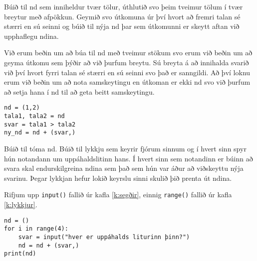 \begin{exercise}\label{nd3}
Búið til nd sem inniheldur tvær tölur, úthlutið svo þeim tveimur tölum í tvær breytur með afpökkun.
Geymið svo útkomuna úr því hvort að fremri talan sé stærri en sú seinni og búið til nýja nd þar sem útkomunni er skeytt aftan við upphaflegu ndina.
\end{exercise}
\begin{Answer}[ref={nd3}]
Við erum beðin um að búa til nd með tveimur stökum svo erum við beðin um að geyma útkomu sem þýðir að við þurfum breytu.
Sú breyta á að innihalda svarið við því hvort fyrri talan sé stærri en sú seinni svo það er sanngildi.
Að því loknu erum við beðin um að nota samskeytingu en útkoman er ekki nd svo við þurfum að setja hana í nd til að geta beitt samskeytingu.
	\begin{lstlisting}
nd = (1,2)
tala1, tala2 = nd
svar = tala1 > tala2
ny_nd = nd + (svar,)\end{lstlisting}
\end{Answer}

\begin{exercise}\label{nd4}
Búið til tóma nd.
Búið til lykkju sem keyrir fjórum sinnum og í hvert sinn spyr hún notandann um uppáhaldslitinn hans.
Í hvert sinn sem notandinn er búinn að svara skal endurskilgreina ndina sem það sem hún var áður að viðskeyttu nýja svarinu.
Þegar lykkjan hefur lokið keyrslu sinni skulið þið prenta út ndina.
\end{exercise}
\begin{Answer}[ref={nd4}]
Rifjum upp  \texttt{input()} fallið úr kafla \ref{k:segðir}, einnig \texttt{range()} fallið úr kafla \ref{k:lykkjur}.
\begin{lstlisting}
nd = ()
for i in range(4):
	svar = input("hver er uppáhalds liturinn þinn?")
	nd = nd + (svar,)
print(nd)\end{lstlisting}
\end{Answer}